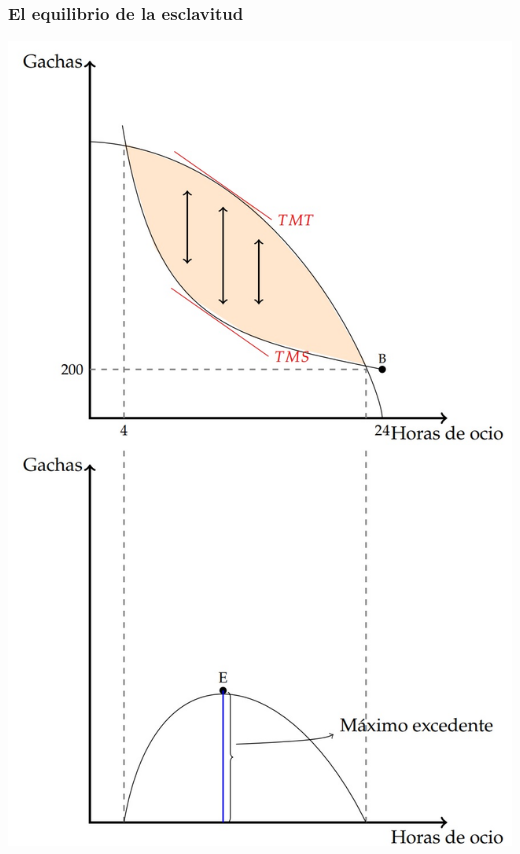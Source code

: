 \documentclass{beamer}
\begin{document}
\begin{frame}
\frametitle{El equilibrio de la esclavitud}
\centering
\centering
\includegraphics[scale=0.55]{Slides Principios de Economia/Figures/Instituciones1.jpg}
\end{frame}

\end{document}
